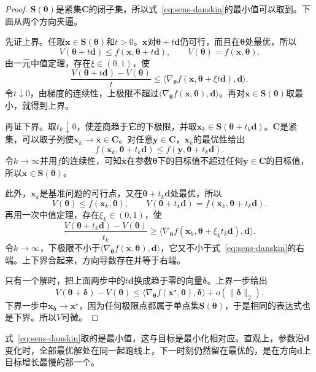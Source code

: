 \begin{proof}
$\bm{S}(\bm{\theta})$是紧集$\bm{C}$的闭子集，所以式~\eqref{eq:sens-danskin}的最小值可以取到。下面从两个方向夹逼。

先证上界。任取$\bm{x}\in\bm{S}(\bm{\theta})$和$t>0$。$\bm{x}$对$\bm{\theta}+t\bm{d}$仍可行，而且在$\bm{\theta}$处最优，所以
\[
 V(\bm{\theta}+t\bm{d})\leq f(\bm{x},\bm{\theta}+t\bm{d}),\qquad V(\bm{\theta})=f(\bm{x},\bm{\theta}).
\]
由一元中值定理，存在$\xi\in(0,1)$，使
\[
 \frac{V(\bm{\theta}+t\bm{d})-V(\bm{\theta})}{t}\leq\bigl\langle\nabla_{\bm{\theta}}f(\bm{x},\bm{\theta}+\xi t\bm{d}),\bm{d}\bigr\rangle.
\]
令$t\downarrow0$，由梯度的连续性，上极限不超过$\langle\nabla_{\bm{\theta}}f(\bm{x},\bm{\theta}),\bm{d}\rangle$。再对$\bm{x}\in\bm{S}(\bm{\theta})$取最小，就得到上界。

再证下界。取$t_k\downarrow0$，使差商趋于它的下极限，并取$\bm{x}_k\in\bm{S}(\bm{\theta}+t_k\bm{d})$。$\bm{C}$是紧集，可以取子列使$\bm{x}_k\to\bar{\bm{x}}\in\bm{C}$。对任意$\bm{y}\in\bm{C}$，$\bm{x}_k$的最优性给出
\[
 f(\bm{x}_k,\bm{\theta}+t_k\bm{d})\leq f(\bm{y},\bm{\theta}+t_k\bm{d}).
\]
令$k\to\infty$并用$f$的连续性，可知$\bar{\bm{x}}$在参数$\bm{\theta}$下的目标值不超过任何$\bm{y}\in\bm{C}$的目标值，所以$\bar{\bm{x}}\in\bm{S}(\bm{\theta})$。

此外，$\bm{x}_k$是基准问题的可行点，又在$\bm{\theta}+t_k\bm{d}$处最优，所以
\[
 V(\bm{\theta})\leq f(\bm{x}_k,\bm{\theta}),\qquad V(\bm{\theta}+t_k\bm{d})=f(\bm{x}_k,\bm{\theta}+t_k\bm{d}).
\]
再用一次中值定理，存在$\xi_k\in(0,1)$，使
\[
 \frac{V(\bm{\theta}+t_k\bm{d})-V(\bm{\theta})}{t_k}\geq\bigl\langle\nabla_{\bm{\theta}}f(\bm{x}_k,\bm{\theta}+\xi_kt_k\bm{d}),\bm{d}\bigr\rangle.
\]
令$k\to\infty$，下极限不小于$\langle\nabla_{\bm{\theta}}f(\bar{\bm{x}},\bm{\theta}),\bm{d}\rangle$，它又不小于式~\eqref{eq:sens-danskin}的右端。上下界合起来，方向导数存在并等于右端。

只有一个解时，把上面两步中的$t\bm{d}$换成趋于零的向量$\bm{\delta}$。上界一步给出
\[
 V(\bm{\theta}+\bm{\delta})-V(\bm{\theta})\leq\langle\nabla_{\bm{\theta}}f(\bm{x}^\star,\bm{\theta}),\bm{\delta}\rangle+o(\lVert\bm{\delta}\rVert_2).
\]
下界一步中$\bm{x}_{\bm{\delta}}\to\bm{x}^\star$，因为任何极限点都属于单点集$\bm{S}(\bm{\theta})$，于是相同的表达式也是下界。所以$V$可微。
\end{proof}

式~\eqref{eq:sens-danskin}取的是最小值，这与目标是最小化相对应。直观上，参数沿$\bm{d}$变化时，全部最优解处在同一起跑线上，下一时刻仍然留在最优的，是在方向$\bm{d}$上目标增长最慢的那一个。

